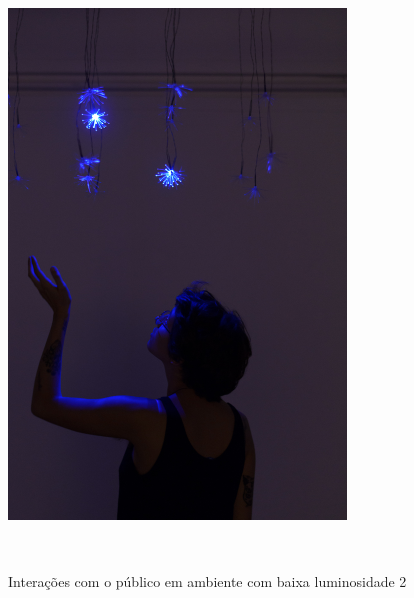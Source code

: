 \begin{apendicesenv}
\begin{figure}[H]
  \begin{center}
    \caption{Interações com o público em ambiente com baixa luminosidade 2}
    \vspace*{0,2cm}
    \includegraphics[width=0.8\textwidth]{./04-figuras/instalacao_2}
    \label{fig:instalacao_2}
  \end{center}
  \vspace*{-0,9cm}
  \\
\end{figure}


\end{apendicesenv}

